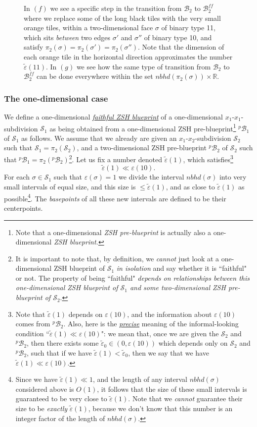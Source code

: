 \documentclass[12pt,letterpaper]{article}
\renewcommand{\S}{\mathcal{S}}
\newcommand{\B}{\mathcal{B}}
\newcommand{\RR}{\mathbb{R}}
\newcommand{\eps}{\varepsilon}
\newcommand{\et}{\tilde\eps}
\newcommand{\nbhd}{\mathit{nbhd}}
\begin{document}
\begin{figure}[htbp]
{%
In $(f)$ we see a specific step in the transition from $\B_2$ to $\B_2^\mathit{ff}$ where we replace some of the long black tiles with the very small orange tiles, within a two-dimensional face $\sigma$ of binary type 11, which sits {\em between} two  edges $\sigma'$ and $\sigma''$ of binary type 10, and satisfy $\pi_2(\sigma) = \pi_2(\sigma') = \pi_2(\sigma'')$. Note that the dimension of each orange tile in the horizontal direction approximates the number $\et(11)$. 
%
In $(g)$ we see how the same type of  transition from $\B_2$ to $\B_2^\mathit{ff}$ can be done everywhere within the set $\nbhd(\pi_2(\sigma)) \times \RR$.
}
\end{figure}





\subsubsection{The one-dimensional case}


We define a one-dimensional \ul{\em faithful ZSH blueprint}  of a one-dimensional $x_1$-$x_1$-subdivision $\S_1$ as being obtained from a one-dimensional ZSH pre-blueprint\footnote{Note that a one-dimensional {\em ZSH pre-blueprint} is  actually also a one-dimensional {\em ZSH blueprint.}} $^p\!\B_1$
of $\S_1$ as follows. We assume that  we already are given  an $x_1$-$x_2$-subdivision $\S_2$ such that $\S_1 = \pi_2(\S_2)$, and a two-dimensional ZSH pre-blueprint $^p\!\B_2$ of $\S_2$ such that $^p\!\B_1 = \pi_2(^p\!\B_2)$\footnote{It is important to note that, by definition, we {\em cannot} just look at a one-dimensional ZSH blueprint of $\S_1$ {\em in isolation} and say whether it is ``faithful" or not. The property of being ``faithful" {\em depends on relationships between this one-dimensional ZSH blueprint of $\S_1$ and some two-dimensional ZSH pre-blueprint of $\S_2$}.}. 
Let us fix a number denoted $\et(1)$, which satisfies\footnote{Note that $\et(1)$ depends on $\eps(10)$, and the information about $\eps(10)$ comes from $^p\!\B_2$. Also, here is the \ul{\em precise} meaning of the informal-looking condition ``$\et(1) \ll \eps(10)$": we mean that, once we are given the $\S_2$ and $^p\!\B_2$, then there exists some $\et_0 \in (0,\eps(10))$ which depends only on $\S_2$ and $^p\!\B_2$, such that if we have $\et(1) < \et_0$, then we say that we have $\et(1) \ll \eps(10)$.}
$$
\et(1) \ll \eps(10).
$$
For each $\sigma \in \S_1$ such that $\eps(\sigma) = 1$ we divide the interval $\nbhd(\sigma)$ into very small intervals of equal size, and this size is $\le \et(1)$, and as close to $\et(1)$ as possible\footnote{Since we have  $\et(1) \ll 1$, and the length of any interval $\nbhd(\sigma)$ considered above  is $O(1)$, it follows that the size of these small intervals is guaranteed to be very close to $\et(1)$. Note that we {\em cannot} guarantee their size to be {\em exactly} $\et(1)$, because we don't know that this number is an integer factor of the length of $\nbhd(\sigma)$.}. The {\em basepoints} of all these new intervals are defined to be their centerpoints. 
\end{document}

